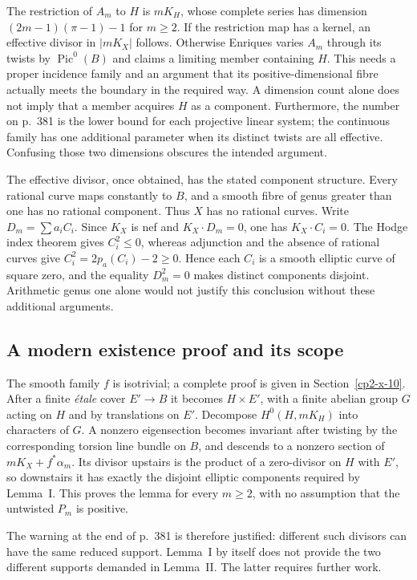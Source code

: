 The restriction of $A_m$ to $H$ is $mK_H$, whose complete series has dimension $(2m-1)(\pi-1)-1$ for $m\geq2$. If the restriction map has a kernel, an effective divisor in $|mK_X|$ follows. Otherwise Enriques varies $A_m$ through its twists by $\operatorname{Pic}^0(B)$ and claims a limiting member containing $H$. This needs a proper incidence family and an argument that its positive-dimensional fibre actually meets the boundary in the required way. A dimension count alone does not imply that a member acquires $H$ as a component. Furthermore, the number on p.~381 is the lower bound for each projective linear system; the continuous family has one additional parameter when its distinct twists are all effective. Confusing those two dimensions obscures the intended argument.

The effective divisor, once obtained, has the stated component structure. Every rational curve maps constantly to $B$, and a smooth fibre of genus greater than one has no rational component. Thus $X$ has no rational curves. Write $D_m=\sum a_iC_i$. Since $K_X$ is nef and $K_X\cdot D_m=0$, one has $K_X\cdot C_i=0$. The Hodge index theorem gives $C_i^2\leq0$, whereas adjunction and the absence of rational curves give $C_i^2=2p_a(C_i)-2\geq0$. Hence each $C_i$ is a smooth elliptic curve of square zero, and the equality $D_m^2=0$ makes distinct components disjoint. Arithmetic genus one alone would not justify this conclusion without these additional arguments.

\subsection{A modern existence proof and its scope}

The smooth family $f$ is isotrivial; a complete proof is given in Section~\ref{cp2-x-10}. After a finite \emph{étale} cover $E'\to B$ it becomes $H\times E'$, with a finite abelian group $G$ acting on $H$ and by translations on $E'$. Decompose $H^0(H,mK_H)$ into characters of $G$. A nonzero eigensection becomes invariant after twisting by the corresponding torsion line bundle on $B$, and descends to a nonzero section of $mK_X+f^*\alpha_m$. Its divisor upstairs is the product of a zero-divisor on $H$ with $E'$, so downstairs it has exactly the disjoint elliptic components required by Lemma~I. This proves the lemma for every $m\geq2$, with no assumption that the untwisted $P_m$ is positive.

The warning at the end of p.~381 is therefore justified: different such divisors can have the same reduced support. Lemma~I by itself does not provide the two different supports demanded in Lemma~II. The latter requires further work.

